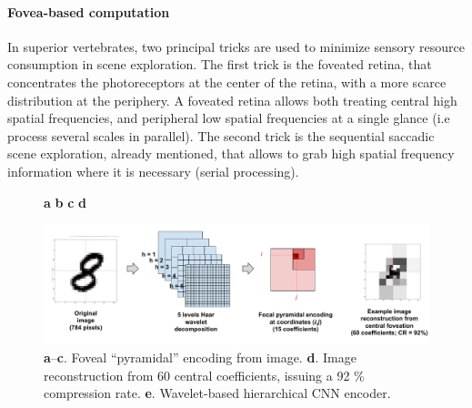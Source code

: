 \documentclass{article}
\begin{document}
\paragraph{Fovea-based computation} 
In superior vertebrates, two principal tricks are used to minimize sensory resource consumption in scene exploration. The first trick is the foveated retina, that concentrates the photoreceptors at the center of the retina, with a more scarce distribution at the periphery. A foveated retina allows both treating central high spatial frequencies, and peripheral low spatial frequencies at a single glance (i.e process several scales in parallel). The second trick is the sequential saccadic scene exploration, already mentioned, that allows to grab high spatial frequency information where it is necessary (serial processing).

\begin{figure}[b!]
	\centerline{
		\hspace{2cm}
		\textbf{a}
		\hspace{4cm}
		\textbf{b}	
		\hspace{3cm}
		\textbf{c}
		\hspace{3cm}
		\textbf{d}
		\hspace{2cm}			
	}
	\centerline{
		\includegraphics[width = \linewidth]{img/ICLR-foveated-model.pdf} 
	}

	\caption{\textbf{a}--\textbf{c}. Foveal ``pyramidal'' encoding from image.
	\textbf{d}. Image reconstruction from 60 central coefficients, issuing a 92 \% compression rate.  
	\textbf{e}. Wavelet-based hierarchical CNN encoder.}\label{fig:foveated}
\end{figure}
\end{document}
